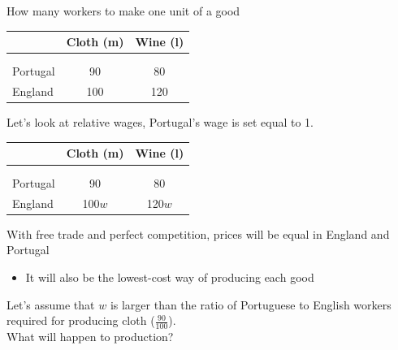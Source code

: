 \documentclass{beamer}
\begin{document}
\begin{frame}
\begin{table}{How many workers to make one unit of a good}
  \begin{tabular}{lcc}
    ~ & Cloth (m) & Wine (l) \\
    \hline \\[-1.8ex]\\	
    Portugal  & 90  & 80\\
    England   & 100  & 120\\    
  \end{tabular}
\end{table}  
\medskip
 Let's look at relative wages, Portugal's wage is set equal to 1.
    \begin{table}
    \begin{tabular}{lcc}
      ~ & Cloth (m) & Wine (l) \\
      \hline \\[-1.8ex]\\	
      Portugal  & 90  & 80\\
      England   & 100$w$  & 120$w$\\    
    \end{tabular}
  \end{table}    
\end{frame}

\begin{frame}
  With free trade and perfect competition, prices will be equal in England and Portugal
  \begin{itemize}
    \item It will also be the lowest-cost way of producing each good
  \end{itemize}
  \medskip
  Let's assume that $w$ is larger than the ratio of Portuguese to English workers required for producing cloth ($\frac{90}{100}$).\\
  \medskip
  What will happen to production?  
\end{frame}
\end{document}
